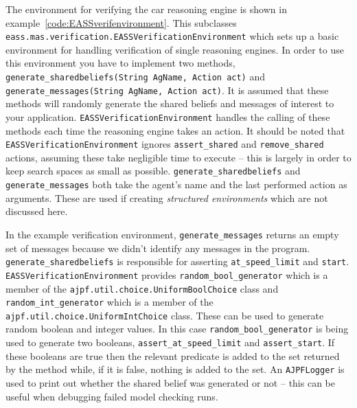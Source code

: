 \begin{sloppypar}
The environment for verifying the car reasoning engine is shown in example~\ref{code:EASSverifenvironment}.  This subclasses \texttt{eass.mas.verification.EASSVerificationEnvironment} which sets up a basic environment for handling verification of single reasoning engines.  In order to use this environment you have to implement two methods, \texttt{generate\_sharedbeliefs(String AgName, Action act)} and \texttt{generate\_messages(String AgName, Action act)}.  It is assumed that these methods will randomly generate the shared beliefs and messages of interest to your application.  \texttt{EASSVerificationEnvironment} handles the calling of these methods each time the reasoning engine takes an action.  It should be noted that \texttt{EASSVerificationEnvironment} ignores \lstinline{assert_shared} and \lstinline{remove_shared} actions, assuming these take negligible time to execute -- this is largely in order to keep search spaces as small as possible.  \texttt{generate\_sharedbeliefs} and \texttt{generate\_messages} both take the agent's name and the last performed action as arguments.  These are used if creating \emph{structured environments} which are not discussed here.
\end{sloppypar}

\begin{sloppypar}
In the example verification environment, \texttt{generate\_messages} returns an empty set of messages because we didn't identify any messages in the program.  \texttt{generate\_sharedbeliefs} is responsible for asserting \lstinline{at_speed_limit} and \lstinline{start}.  \texttt{EASSVerificationEnvironment} provides \texttt{random\_bool\_generator} which is a member of the \texttt{ajpf.util.choice.UniformBoolChoice} class and \texttt{random\_int\_generator} which is a member of the \texttt{ajpf.util.choice.UniformIntChoice} class.  These can be used to generate random boolean and integer values.  In this case \texttt{random\_bool\_generator} is being used to generate two booleans, \texttt{assert\_at\_speed\_limit} and \texttt{assert\_start}.  If these booleans are true then the relevant predicate is added to the set returned by the method while, if it is false, nothing is added to the set.  An \texttt{AJPFLogger} is used to print out whether the shared belief was generated or not -- this can be useful when debugging failed model checking runs.
\end{sloppypar}

